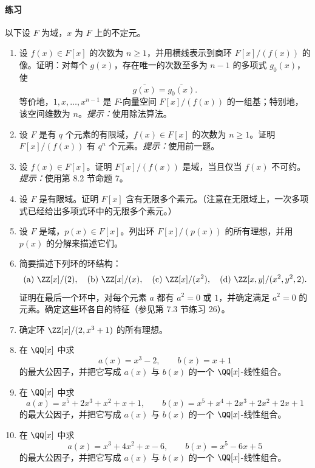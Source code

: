 \paragraph{练习}
以下设 $F$ 为域，$x$ 为 $F$ 上的不定元。
\begin{enumerate}[label=\arabic*.]
	\item 设 $f(x)\in F[x]$ 的次数为 $n\geq1$，并用横线表示到商环 $F[x]/(f(x))$ 的像。证明：对每个 $g(x)$，存在唯一的次数至多为 $n-1$ 的多项式 $g_0(x)$，使
	\[
	\overline{g(x)}=\overline{g_0(x)}.
	\]
	等价地，$1,x,\ldots,x^{n-1}$ 是 $F$-向量空间 $F[x]/(f(x))$ 的一组基；特别地，该空间维数为 $n$。\emph{提示：}使用除法算法。
	
	\item 设 $F$ 是有 $q$ 个元素的有限域，$f(x)\in F[x]$ 的次数为 $n\geq1$。证明 $F[x]/(f(x))$ 有 $q^n$ 个元素。\emph{提示：}使用前一题。
	
	\item 设 $f(x)\in F[x]$。证明 $F[x]/(f(x))$ 是域，当且仅当 $f(x)$ 不可约。\emph{提示：}使用第 8.2 节命题 7。
	
	\item 设 $F$ 是有限域。证明 $F[x]$ 含有无限多个素元。（注意在无限域上，一次多项式已经给出多项式环中的无限多个素元。）
	
	\item 设 $F$ 是域，$p(x)\in F[x]$。列出环 $F[x]/(p(x))$ 的所有理想，并用 $p(x)$ 的分解来描述它们。
	
	\item 简要描述下列环的环结构：
	\[
	\text{(a) }\ZZ[x]/(2),\quad
	\text{(b) }\ZZ[x]/(x),\quad
	\text{(c) }\ZZ[x]/(x^2),\quad
	\text{(d) }\ZZ[x,y]/(x^2,y^2,2).
	\]
	证明在最后一个环中，对每个元素 $a$ 都有 $a^2=0$ 或 $1$，并确定满足 $a^2=0$ 的元素。确定这些环各自的特征（参见第 7.3 节练习 26）。
	
	\item 确定环 $\ZZ[x]/(2,x^3+1)$ 的所有理想。
	
	\item 在 $\QQ[x]$ 中求
	\[
	a(x)=x^3-2,
	\qquad b(x)=x+1
	\]
	的最大公因子，并把它写成 $a(x)$ 与 $b(x)$ 的一个 $\QQ[x]$-线性组合。
	
	\item 在 $\QQ[x]$ 中求
	\[
	a(x)=x^5+2x^3+x^2+x+1,
	\qquad b(x)=x^5+x^4+2x^3+2x^2+2x+1
	\]
	的最大公因子，并把它写成 $a(x)$ 与 $b(x)$ 的一个 $\QQ[x]$-线性组合。
	
	\item 在 $\QQ[x]$ 中求
	\[
	a(x)=x^3+4x^2+x-6,
	\qquad b(x)=x^5-6x+5
	\]
	的最大公因子，并把它写成 $a(x)$ 与 $b(x)$ 的一个 $\QQ[x]$-线性组合。
	

\end{enumerate}
